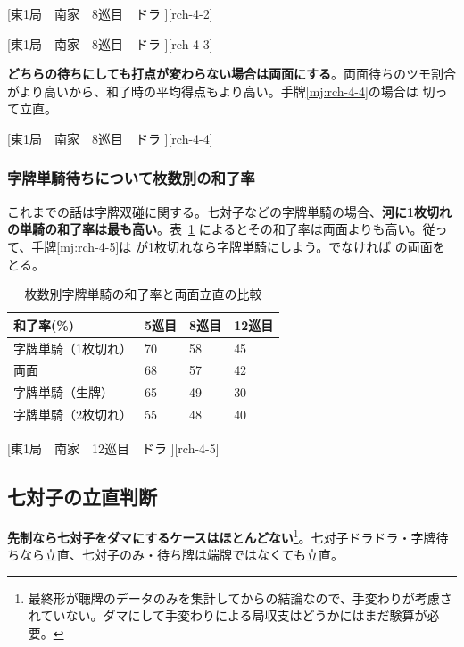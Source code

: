 \documentclass[10pt, twocolumn]{article}
\begin{document}
[東1局　南家　8巡目　ドラ ][rch-4-2]

[東1局　南家　8巡目　ドラ ][rch-4-3]

\textbf{どちらの待ちにしても打点が変わらない場合は両面にする}\citep[][p. 52]{miinin-stat}。両面待ちのツモ割合がより高いから、和了時の平均得点もより高い。手牌\ref{mj:rch-4-4}の場合は  切って立直。

[東1局　南家　8巡目　ドラ ][rch-4-4] 

\subsubsection*{字牌単騎待ちについて枚数別の和了率} 

これまでの話は字牌双碰に関する。七対子などの字牌単騎の場合、\textbf{河に1枚切れの単騎の和了率は最も高い}\citep[][p. 64]{miinin-stat}。表~\ref{tab:winrate-jihai-tanki} によるとその和了率は両面よりも高い。従って、手牌\ref{mj:rch-4-5}は  が1枚切れなら字牌単騎にしよう。でなければ  の両面をとる。

\begin{table}[ht]
  \centering
  \begin{tabular}{llll}
    和了率(\%) & 5巡目 & 8巡目 & 12巡目 \\
    \hline
    字牌単騎（1枚切れ） & 70 & 58 & 45 \\
    両面             & 68 & 57 & 42 \\
    字牌単騎（生牌）   & 65 & 49 & 30 \\
    字牌単騎（2枚切れ）& 55 & 48 & 40
  \end{tabular}
  \caption{枚数別字牌単騎の和了率と両面立直の比較}
  \label{tab:winrate-jihai-tanki}
\end{table}

[東1局　南家　12巡目　ドラ ][rch-4-5] 

\subsection{七対子の立直判断}

\textbf{先制なら七対子をダマにするケースはほとんどない}\footnote{最終形が聴牌のデータのみを集計してからの結論なので、手変わりが考慮されていない\citep[][p.~102]{miinin-choice}。ダマにして手変わりによる局収支はどうかにはまだ験算が必要。}。七対子ドラドラ・字牌待ちなら立直、七対子のみ・待ち牌は端牌ではなくても立直\citep[][pp. 101--102]{miinin-choice}。
\end{document}
